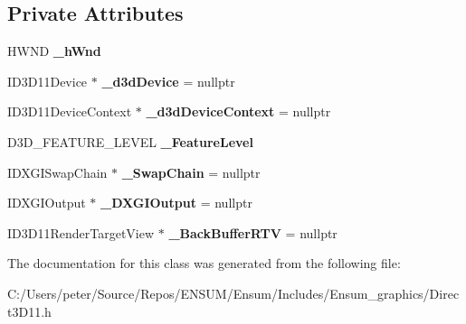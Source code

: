 \subsection*{Private Attributes}
\begin{DoxyCompactItemize}
\item 
H\+W\+ND {\bfseries \+\_\+h\+Wnd}\hypertarget{class_ensum_1_1_graphics_1_1_direct3_d11_ad3fb134a667bf1b31aa6335311c6c874}{}\label{class_ensum_1_1_graphics_1_1_direct3_d11_ad3fb134a667bf1b31aa6335311c6c874}

\item 
I\+D3\+D11\+Device $\ast$ {\bfseries \+\_\+d3d\+Device} = nullptr\hypertarget{class_ensum_1_1_graphics_1_1_direct3_d11_aa6a1333e30d315bd6b2136dd6e23018c}{}\label{class_ensum_1_1_graphics_1_1_direct3_d11_aa6a1333e30d315bd6b2136dd6e23018c}

\item 
I\+D3\+D11\+Device\+Context $\ast$ {\bfseries \+\_\+d3d\+Device\+Context} = nullptr\hypertarget{class_ensum_1_1_graphics_1_1_direct3_d11_ade2ce6e90bff8d33867c4af788702741}{}\label{class_ensum_1_1_graphics_1_1_direct3_d11_ade2ce6e90bff8d33867c4af788702741}

\item 
D3\+D\+\_\+\+F\+E\+A\+T\+U\+R\+E\+\_\+\+L\+E\+V\+EL {\bfseries \+\_\+\+Feature\+Level}\hypertarget{class_ensum_1_1_graphics_1_1_direct3_d11_a82861081b0fedc420c16f0f6c10a201d}{}\label{class_ensum_1_1_graphics_1_1_direct3_d11_a82861081b0fedc420c16f0f6c10a201d}

\item 
I\+D\+X\+G\+I\+Swap\+Chain $\ast$ {\bfseries \+\_\+\+Swap\+Chain} = nullptr\hypertarget{class_ensum_1_1_graphics_1_1_direct3_d11_a0253d19ec8e600ce61c09be8507b40be}{}\label{class_ensum_1_1_graphics_1_1_direct3_d11_a0253d19ec8e600ce61c09be8507b40be}

\item 
I\+D\+X\+G\+I\+Output $\ast$ {\bfseries \+\_\+\+D\+X\+G\+I\+Output} = nullptr\hypertarget{class_ensum_1_1_graphics_1_1_direct3_d11_afd6c2e521b0144834f1ebf76029125eb}{}\label{class_ensum_1_1_graphics_1_1_direct3_d11_afd6c2e521b0144834f1ebf76029125eb}

\item 
I\+D3\+D11\+Render\+Target\+View $\ast$ {\bfseries \+\_\+\+Back\+Buffer\+R\+TV} = nullptr\hypertarget{class_ensum_1_1_graphics_1_1_direct3_d11_ad9086848e620026c6861dc245db02edc}{}\label{class_ensum_1_1_graphics_1_1_direct3_d11_ad9086848e620026c6861dc245db02edc}

\end{DoxyCompactItemize}


The documentation for this class was generated from the following file\+:\begin{DoxyCompactItemize}
\item 
C\+:/\+Users/peter/\+Source/\+Repos/\+E\+N\+S\+U\+M/\+Ensum/\+Includes/\+Ensum\+\_\+graphics/Direct3\+D11.\+h\end{DoxyCompactItemize}
